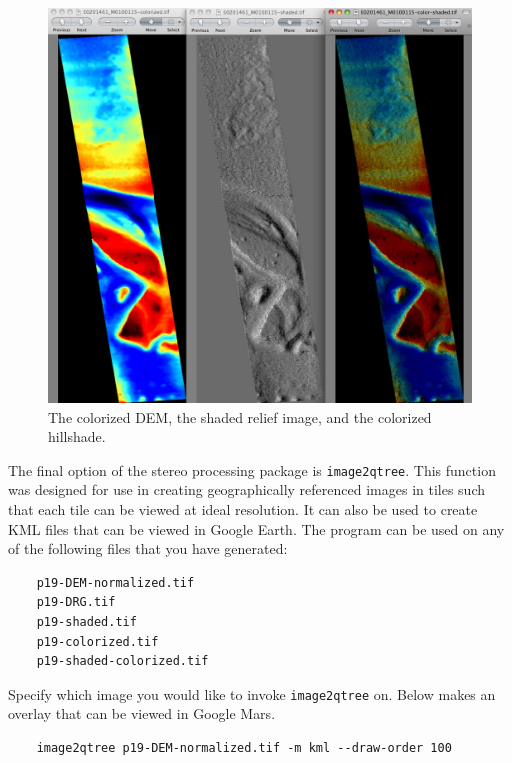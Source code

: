 \begin{figure}
\begin{center}
\includegraphics[width=5in]{images/p19-colorized-shaded.png}
\caption[P19 colorized and shaded relief]{
    \label{p19-color}
	The colorized DEM, the shaded relief image, and the colorized hillshade.
    }
\end{center}
\end{figure}

The final option of the stereo processing package is
\texttt{image2qtree}.  This function was designed for use in creating
geographically referenced images in tiles such that each tile can be
viewed at ideal resolution. It can also be used to create KML files
that can be viewed in Google Earth. The program can be used on any of
the following files that you have generated:
\begin{verbatim}
    p19-DEM-normalized.tif
    p19-DRG.tif
    p19-shaded.tif
    p19-colorized.tif
    p19-shaded-colorized.tif
\end{verbatim}

Specify which image you would like to invoke \texttt{image2qtree}
on. Below makes an overlay that can be viewed in Google Mars.

\begin{verbatim}
    image2qtree p19-DEM-normalized.tif -m kml --draw-order 100
\end{verbatim}



